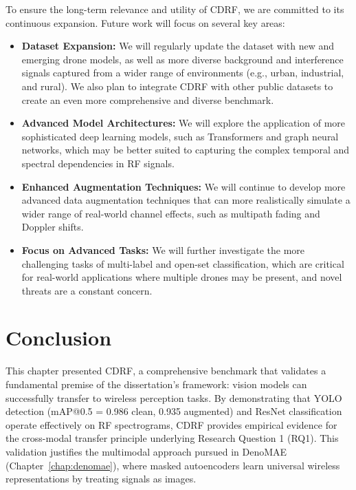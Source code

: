 To ensure the long-term relevance and utility of CDRF, we are committed to its continuous expansion. Future work will focus on several key areas:
\begin{itemize}
    \item \textbf{Dataset Expansion:} We will regularly update the dataset with new and emerging drone models, as well as more diverse background and interference signals captured from a wider range of environments (e.g., urban, industrial, and rural). We also plan to integrate CDRF with other public datasets to create an even more comprehensive and diverse benchmark.
    \item \textbf{Advanced Model Architectures:} We will explore the application of more sophisticated deep learning models, such as Transformers and graph neural networks, which may be better suited to capturing the complex temporal and spectral dependencies in RF signals.
    \item \textbf{Enhanced Augmentation Techniques:} We will continue to develop more advanced data augmentation techniques that can more realistically simulate a wider range of real-world channel effects, such as multipath fading and Doppler shifts.
    \item \textbf{Focus on Advanced Tasks:} We will further investigate the more challenging tasks of multi-label and open-set classification, which are critical for real-world applications where multiple drones may be present, and novel threats are a constant concern.
\end{itemize}

\section{Conclusion}
\label{sec:crdf_conclusion}

This chapter presented CDRF, a comprehensive benchmark that validates a fundamental premise of the dissertation's framework: vision models can successfully transfer to wireless perception tasks. By demonstrating that YOLO detection (mAP@0.5 = 0.986 clean, 0.935 augmented) and ResNet classification operate effectively on RF spectrograms, CDRF provides empirical evidence for the cross-modal transfer principle underlying Research Question 1 (RQ1). This validation justifies the multimodal approach pursued in DenoMAE (Chapter~\ref{chap:denomae}), where masked autoencoders learn universal wireless representations by treating signals as images.

